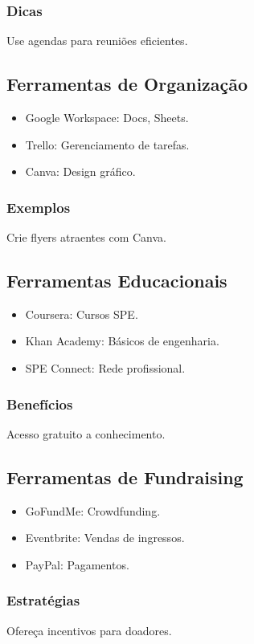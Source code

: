\documentclass[12pt]{article}
\begin{document}
\subsubsection{Dicas}
Use agendas para reuniões eficientes.

\subsection{Ferramentas de Organização}
\begin{itemize}
    \item Google Workspace: Docs, Sheets.
    \item Trello: Gerenciamento de tarefas.
    \item Canva: Design gráfico.
\end{itemize}

\subsubsection{Exemplos}
Crie flyers atraentes com Canva.

\subsection{Ferramentas Educacionais}
\begin{itemize}
    \item Coursera: Cursos SPE.
    \item Khan Academy: Básicos de engenharia.
    \item SPE Connect: Rede profissional.
\end{itemize}

\subsubsection{Benefícios}
Acesso gratuito a conhecimento.

\subsection{Ferramentas de Fundraising}
\begin{itemize}
    \item GoFundMe: Crowdfunding.
    \item Eventbrite: Vendas de ingressos.
    \item PayPal: Pagamentos.
\end{itemize}

\subsubsection{Estratégias}
Ofereça incentivos para doadores.
\end{document}
